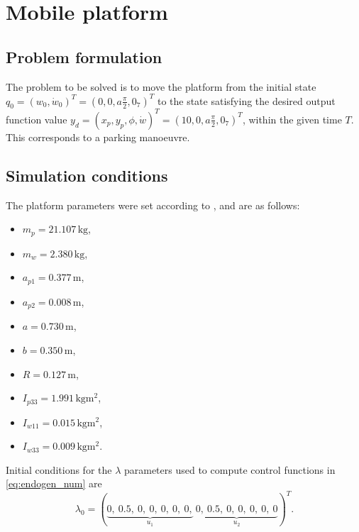 

\section{Mobile platform}
\subsection{Problem formulation}
\label{sec:rex_task}
The problem to be solved is to move the platform from the initial state
$q_0 = (w_0, \dot{w}_0)^T = (0, 0, a\frac{\pi}{2}, 0_7)^T$ to the state satisfying the desired
output function value
$y_d=(x_p, y_p, \phi, \dot w)^T = (10, 0, a\frac{\pi}{2}, 0_7)^T$, 
within the given time $T$. 
This corresponds to a parking manoeuvre.
%

\subsection{Simulation conditions}
\label{sec:pltf_params}
The platform parameters were set according to \cite{coupled}, and are as follows:
\begin{multicols}{2}
\begin{itemize}
\item $m_p = 21.107\,\mathrm{kg}$,
\item $m_w = 2.380\,\mathrm{kg}$,
\item $a_{p1} = 0.377\,\mathrm{m}$,
\item $a_{p2} = 0.008\,\mathrm{m}$,
\item $a = 0.730\,\mathrm{m}$,
\item $b = 0.350\,\mathrm{m}$,
\item $R = 0.127\,\mathrm{m}$,
\item $I_{p33} = 1.991\,\mathrm{kgm^2}$,
\item $I_{w11} = 0.015\,\mathrm{kgm^2}$,
\item $I_{w33} = 0.009\,\mathrm{kgm^2}$.
\end{itemize}
\end{multicols}
\hspace{-\parindent}Initial conditions for the $\lambda$ parameters used to compute control functions
in \eqref{eq:endogen_num} are
\begin{equation}
\lambda_0=
(\underbrace{0, \ 0.5, \ 0, \ 0, \ 0, \ 0, \ 0,}_{u_1}\ \underbrace{0, \ 0.5, \ 0, \ 0, \ 0, \ 0, \ 0}_{u_2})^T.
\end{equation}
 	

